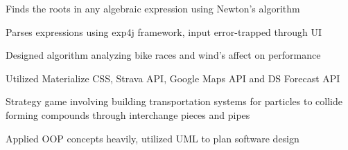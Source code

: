 \documentclass[]{deedy-resume-openfont}
\begin{document}
\begin{minipage}[t]{0.66\textwidth}
\begin{tightemize}
\item Finds the roots in any algebraic expression using Newton's algorithm\\ %
\item Parses expressions using exp4j framework, input error-trapped through UI\\
\end{tightemize}
\sectionsep

\begin{tightemize}
\item Designed algorithm analyzing bike races and wind's affect on performance \\
\item Utilized Materialize CSS, Strava API, Google Maps API and DS Forecast API\\
\end{tightemize}
\sectionsep



\begin{tightemize}
\item Strategy game involving building transportation systems for particles to collide forming compounds through interchange pieces and pipes\\
\item Applied OOP concepts heavily, utilized UML to plan software design \\
\end{tightemize}
\sectionsep


\end{minipage}
\end{document}
